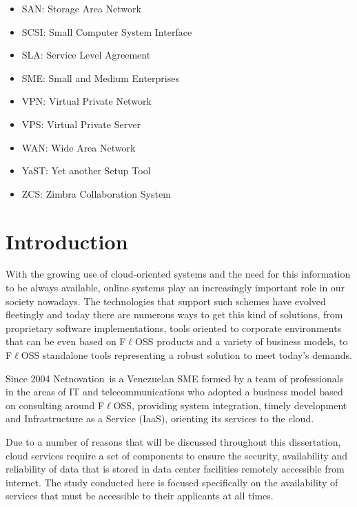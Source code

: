 \documentclass[a4paper, 12pt]{book}
\begin{document}
\begin{itemize}[label={}]
	\item SAN: Storage Area Network
	\item SCSI: Small Computer System Interface
	\item SLA: Service Level Agreement
	\item SME: Small and Medium Enterprises
	\item VPN: Virtual Private Network
	\item VPS: Virtual Private Server
	\item WAN: Wide Area Network
	\item YaST: Yet another Setup Tool
	\item ZCS: Zimbra Collaboration System
\end{itemize}


%
\tableofcontents  	%
\listoffigures  	%
\listoftables 		%

%
\chapter{Introduction}
\label{chap:introduction}

\noindent With the growing use of cloud-oriented systems and the need for this information to be always available, online systems play an increasingly important role in our society nowadays. The technologies that support such schemes have evolved fleetingly and today there are numerous ways to get this kind of solutions, from proprietary software implementations, tools oriented to corporate environments that can be even based on F$\ell$OSS products and a variety of business models, to F$\ell$OSS standalone tools representing a robust solution to meet today's demands.\bigskip

\noindent Since 2004 Netnovation\texttrademark \ is a Venezuelan SME formed by a team of professionals in the areas of IT and telecommunications who adopted a business model based on consulting around F$\ell$OSS, providing system integration, timely development and Infrastructure as a Service (IaaS), orienting its services to the cloud.\bigskip

\noindent Due to a number of reasons that will be discussed throughout this dissertation, cloud services require a set of components to ensure the security, availability and reliability of data that is stored in data center facilities remotely accessible from internet. The study conducted here is focused specifically on the availability of services that must be accessible to their applicants at all times.\bigskip
\end{document}
